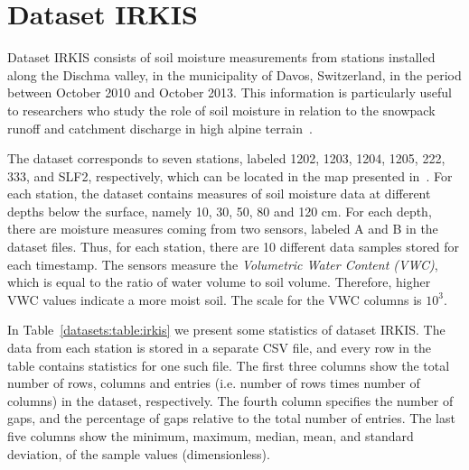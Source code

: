 
\section{Dataset IRKIS}
\label{datasets:irkis}


Dataset IRKIS \cite{dataset:irkis} consists of soil moisture measurements from stations installed along the Dischma valley, in the municipality of Davos, Switzerland, in the period between October 2010 and October 2013. This information is particularly useful to researchers who study the role of soil moisture in relation to the snowpack runoff and catchment discharge in high alpine terrain~\cite{dataset:irkis2}. 


The dataset corresponds to seven stations, labeled 1202, 1203, 1204, 1205, 222, 333, and SLF2, respectively, which can be located in the map presented in~\cite{dataset:irkis}. For each station, the dataset contains measures of soil moisture data at different depths below the surface, namely 10, 30, 50, 80 and 120 cm. For each depth, there are moisture measures coming from two sensors, labeled A and B in the dataset files. Thus, for each station, there are 10 different data samples stored for each timestamp. The sensors measure the \textit{Volumetric Water Content (VWC)}, which is equal to the ratio of water volume to soil volume. Therefore, higher VWC values indicate a more moist soil.
The scale for the VWC columns is $10^3$.


\newcommand{\commonTable}{The first three columns show the total number of rows, columns and entries (i.e. number of rows times number of columns) in the dataset, respectively. The fourth column specifies the number of gaps, and the percentage of gaps relative to the total number of entries. The last five columns show the minimum, maximum, median, mean, and standard deviation, of the sample values }


In Table~\ref{datasets:table:irkis} we present some statistics of dataset IRKIS. The data from each station is stored in a separate CSV file, and every row in the table contains statistics for one such file. \commonTable (dimensionless).


\clearpage



